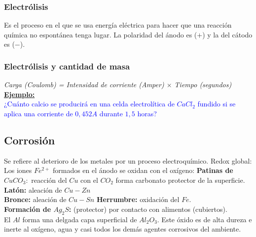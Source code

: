         \subsubsection{Electrólisis}
            \sangria{} Es el proceso en el que se usa energía eléctrica para hacer que una reacción química no espontánea tenga lugar. La polaridad del ánodo es ($+$) y la del cátodo es ($-$).
            \saltoPag{}
        \subsubsection{Electrólisis y cantidad de masa}
        \textit{Carga (Coulomb) = Intensidad de corriente (Amper) $\times$ Tiempo (segundos)}
        \textbf{\underline{Ejemplo:}} \\
        \textcolor{blue}{¿Cuánto calcio se producirá en una celda electrolítica de $CaCl_2$ fundido si se aplica una corriente de $0,452A$ durante $1,5$ horas?}
    \subsection{Corrosión}
    \sangria{} Se refiere al deterioro de los metales por un proceso electroquímico.
    Redox global:
    Los iones $Fe^{2+}$ formados en el ánodo se oxidan con el oxígeno:
    \textbf{Patinas de $CuCO_3:$} reacción del $Cu$ con el $CO_2$ forma carbonato protector de la superficie. \\
    \textbf{Latón:} aleación de $Cu-Zn$ \\
    \textbf{Bronce:} aleación de $Cu-Sn$
    \textbf{Herrumbre:} oxidación del $Fe$. \\
    \textbf{Formación de $Ag_2S$:} (protector) por contacto con alimentos (cubiertos). \\
    El $Al$ forma una delgada capa superficial de $Al_2O_3$. Este óxido es de alta dureza e inerte al oxígeno, agua y casi todos los demás agentes corrosivos del ambiente.
